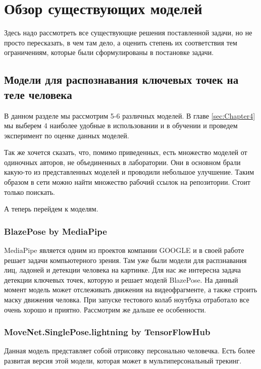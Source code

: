 \section{Обзор существующих моделей}
\label{sec:Chapter2} 
Здесь надо рассмотреть все существующие решения поставленной задачи, но не просто пересказать, в чем там дело, а оценить степень их соответствия тем ограничениям, которые были сформулированы в постановке задачи.


\subsection{Модели для распознавания ключевых точек на теле человека}

В данном разделе мы рассмотрим 5-6 различных моделей. В главе \ref{sec:Chapter4} мы выберем 4 наиболее удобные в использовании и в обучении и проведем эксперимент по оценке данных моделей.

Так же хочется сказать, что, помимо приведенных, есть множество моделей от одиночных авторов, не объединенных в лаборатории. Они в основном брали какую-то из представленных моделей и проводили небольшое улучшение. Таким образом в сети можно найти множество рабочий ссылок на репозитории. Стоит только поискать.

А теперь перейдем к моделям.

\subsubsection{BlazePose by MediaPipe}

MediaPipe является одним из проектов компании GOOGLE и в своей работе решает задачи компьютерного зрения. Там уже были модели для распзнавания лиц, ладоней и детекции человека на картинке. Для нас же интересна задача детекции ключевых точек, которую и решает моделй BlazePose. На данный момент модель может отслеживать движения на видеофрагменте, а также строить маску движения человка. При запуске тестового колаб ноутбука отработало все очень хорошо и приятно. Рассмотрим же дальше ее особенности.

\subsubsection{MoveNet.SinglePose.lightning by TensorFlowHub}

Данная модель представляет собой отрисовку персонально человечка. Есть более развитая версия этой модели, которая может в мультиперсональный трекинг.

